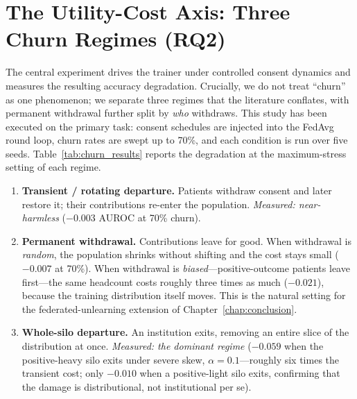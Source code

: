 \documentclass[12pt]{report}
\begin{document}
\section{The Utility-Cost Axis: Three Churn Regimes (RQ2)}
\label{sec:utility_axis}

The central experiment drives the trainer under controlled consent dynamics and
measures the resulting accuracy degradation. Crucially, we do not treat ``churn''
as one phenomenon; we separate three regimes that the literature conflates, with
permanent withdrawal further split by \emph{who} withdraws. This study has been
executed on the primary task: consent schedules are injected into the FedAvg
round loop, churn rates are swept up to 70\%, and each condition is run over
five seeds. Table~\ref{tab:churn_results} reports the degradation at the
maximum-stress setting of each regime.

\begin{enumerate}
  \item \textbf{Transient / rotating departure.} Patients withdraw consent and
        later restore it; their contributions re-enter the population.
        \emph{Measured: near-harmless} ($-0.003$ AUROC at 70\% churn).
  \item \textbf{Permanent withdrawal.} Contributions leave for good. When
        withdrawal is \emph{random}, the population shrinks without shifting and
        the cost stays small ($-0.007$ at 70\%). When withdrawal is
        \emph{biased}---positive-outcome patients leave first---the same
        headcount costs roughly three times as much ($-0.021$), because the
        training distribution itself moves. This is the natural setting for the
        federated-unlearning extension of Chapter~\ref{chap:conclusion}.
  \item \textbf{Whole-silo departure.} An institution exits, removing an entire
        slice of the distribution at once. \emph{Measured: the dominant regime}
        ($-0.059$ when the positive-heavy silo exits under severe skew,
        $\alpha{=}0.1$---roughly six times the transient cost; only $-0.010$
        when a positive-light silo exits, confirming that the damage is
        distributional, not institutional per se).
\end{enumerate}
\end{document}
